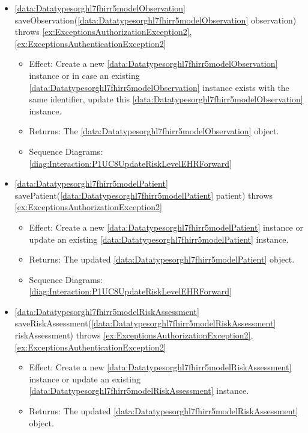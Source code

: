 \begin{description}
\begin{itemize}[noitemsep,nolistsep,leftmargin=-.25cm]
\begin{itemize}
        \end{itemize}
      \item \textsf{\ref{data:Datatypesorghl7fhirr5modelObservation} saveObservation(\ref{data:Datatypesorghl7fhirr5modelObservation} observation) throws \ref{ex:ExceptionsAuthorizationException2}, \ref{ex:ExceptionsAuthenticationException2}}
        \begin{itemize}[noitemsep,nolistsep]
           \item Effect: Create a new \ref{data:Datatypesorghl7fhirr5modelObservation} instance or in case an existing \ref{data:Datatypesorghl7fhirr5modelObservation} instance exists with the same identifier, update this \ref{data:Datatypesorghl7fhirr5modelObservation} instance. 
           \item Returns: The \ref{data:Datatypesorghl7fhirr5modelObservation} object.
           \item Sequence Diagrams: \cref{diag:Interaction:P1UC8UpdateRiskLevelEHRForward}
        \end{itemize}
      \item \textsf{\ref{data:Datatypesorghl7fhirr5modelPatient} savePatient(\ref{data:Datatypesorghl7fhirr5modelPatient} patient) throws \ref{ex:ExceptionsAuthorizationException2}}
        \begin{itemize}[noitemsep,nolistsep]
           \item Effect: Create a new \ref{data:Datatypesorghl7fhirr5modelPatient} instance or update an existing \ref{data:Datatypesorghl7fhirr5modelPatient} instance. 
           \item Returns: The updated \ref{data:Datatypesorghl7fhirr5modelPatient} object.
           \item Sequence Diagrams: \cref{diag:Interaction:P1UC8UpdateRiskLevelEHRForward}
        \end{itemize}
      \item \textsf{\ref{data:Datatypesorghl7fhirr5modelRiskAssessment} saveRiskAssessment(\ref{data:Datatypesorghl7fhirr5modelRiskAssessment} riskAssessment) throws \ref{ex:ExceptionsAuthorizationException2}, \ref{ex:ExceptionsAuthenticationException2}}
        \begin{itemize}[noitemsep,nolistsep]
           \item Effect: Create a new \ref{data:Datatypesorghl7fhirr5modelRiskAssessment} instance or update an existing \ref{data:Datatypesorghl7fhirr5modelRiskAssessment} instance. 
           \item Returns: The updated \ref{data:Datatypesorghl7fhirr5modelRiskAssessment} object.

\end{itemize}
\end{itemize}
\end{description}
